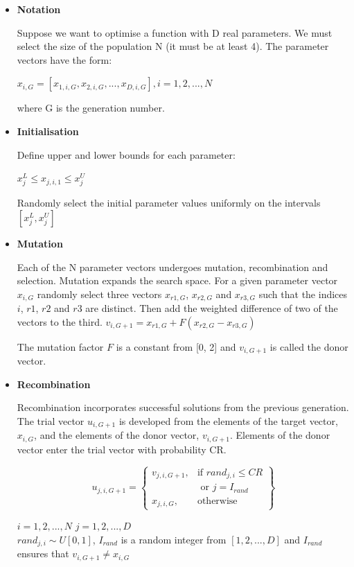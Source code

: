 \documentclass[A4, twocolumn]{article}
\begin{document}
	\begin{itemize}
		\item{\textbf{Notation}}
		
		Suppose we want to optimise a function with D real parameters. We must select the size of the population N (it must be at least 4). The parameter vectors have the form:
		
		$x_{i, G} = [x_{1, i, G}, x_{2,i,G}, ..., x_{D,i,G}], i = 1, 2, ..., N$
		
		where G is the generation number.
		
		\item{\textbf{Initialisation}}
		
		Define upper and lower bounds for each parameter:
		
		$ x^{L}_{j} \leq x_{j,i,1} \leq x^{U}_{j}$
		
		Randomly select the initial parameter values uniformly on the intervals $[x^{L}_{j}, x^{U}_{j}]$
		\item{\textbf{Mutation}}
		
		Each of the N parameter vectors undergoes mutation, recombination and
		selection. Mutation expands the search space. For a given parameter vector $x_{i, G}$ randomly select three vectors $x_{r1, G}$, $x_{r2, G}$ and $x_{r3, G}$ such that the indices $i$, $r1$, $r2$ and $r3$ are distinct. Then add the weighted difference of two of the vectors to the third. 
		$v_{i, G+1} = x_{r1, G} + F(x_{r2, G} - x_{r3, G})$		
		
		The  mutation factor $F$ is a constant from [0, 2] and $v_{i, G+1}$ is called the donor vector. 
		\item{\textbf{Recombination}}
		
		Recombination incorporates successful solutions from the previous generation. The trial vector $u_{i,G+1}$ is developed from the elements of the target vector, $x_{i,G}$, and the elements of the donor vector, $v_{i,G+1}$. Elements of the donor vector enter the trial vector with probability CR. 
		
	
		\[
		u_{j,i,G+1} = \left\{
		\begin{array}{lr}
		v_{j,i,G+1}, & \text{if } rand_{j,i} \leq CR \\
		& \text{ or } j = I_{rand}\\
		x_{j,i,G}, & \text{otherwise }
		\end{array} \right\}
		\]
		
		$i = 1,2,...,N$
		$j = 1,2,...,D$ \\
		$rand_{j,i} ∼ U[0, 1]$, $I_{rand}$ is a random integer from $[1, 2, ..., D]$
		and $I_{rand}$ ensures that $v_{i,G+1} \neq x_{i,G}$
		

\end{itemize}
\end{document}
